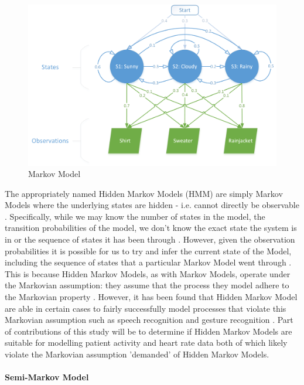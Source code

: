 \documentclass[]{article}
\begin{document}
\begin{figure}
	\includegraphics[width=0.82\linewidth]{../modelDevelopmentFlowcharts/HMMDiagram.png}
	\caption{Markov Model}
	\label{fig:HMM}
\end{figure}

The appropriately named Hidden Markov Models (HMM) are simply Markov Models where the underlying states are hidden - i.e. cannot directly be observable \cite{Jurafsky2017,Bobick2015a,Gagniuc2017,OConnell2011,Rabiner1989}. Specifically, while we may know the number of states in the model, the transition probabilities of the model, we don't know the exact state the system is in or the sequence of states it has been through \cite{Jurafsky2017,Bobick2015a,Gagniuc2017,OConnell2011,Rabiner1989}. However, given the observation probabilities it is possible for us to try and infer the current state of the Model, including the sequence of states that a particular Markov Model went through \cite{Jurafsky2017,Bobick2015a,Gagniuc2017,OConnell2011,Rabiner1989,Mailund2014}. This is because Hidden Markov Models, as with Markov Models, operate under the Markovian assumption: they assume that the process they model adhere to the Markovian property \cite{Rabiner1989,Jurafsky2017,Bobick2015,Bobick2015a}. However, it has been found that Hidden Markov Model are able in certain cases to fairly successfully model processes that violate this Markovian assumption such as speech recognition and gesture recognition \cite{Altman2007,Jelinek,Rabiner1989}. Part of contributions of this study will be to determine if Hidden Markov Models are suitable for modelling patient activity and heart rate data both of which likely violate the Markovian assumption 'demanded' of Hidden Markov Models.

\paragraph{Semi-Markov Model}
\end{document}
